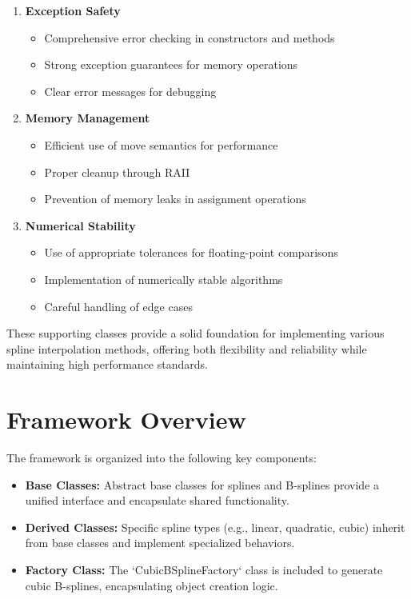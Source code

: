 \documentclass{article}
\begin{document}
\begin{enumerate}
    \item \textbf{Exception Safety}
    \begin{itemize}
        \item Comprehensive error checking in constructors and methods
        \item Strong exception guarantees for memory operations
        \item Clear error messages for debugging
    \end{itemize}
    
    \item \textbf{Memory Management}
    \begin{itemize}
        \item Efficient use of move semantics for performance
        \item Proper cleanup through RAII
        \item Prevention of memory leaks in assignment operations
    \end{itemize}
    
    \item \textbf{Numerical Stability}
    \begin{itemize}
        \item Use of appropriate tolerances for floating-point comparisons
        \item Implementation of numerically stable algorithms
        \item Careful handling of edge cases
    \end{itemize}
\end{enumerate}

These supporting classes provide a solid foundation for implementing various spline interpolation methods, offering both flexibility and reliability while maintaining high performance standards.


\section{Framework Overview}
The framework is organized into the following key components:

\begin{itemize}
    \item \textbf{Base Classes:} Abstract base classes for splines and B-splines provide a unified interface and encapsulate shared functionality.
    \item \textbf{Derived Classes:} Specific spline types (e.g., linear, quadratic, cubic) inherit from base classes and implement specialized behaviors.
    \item \textbf{Factory Class:} The `CubicBSplineFactory` class is included to generate cubic B-splines, encapsulating object creation logic.
\end{itemize}
\end{document}
